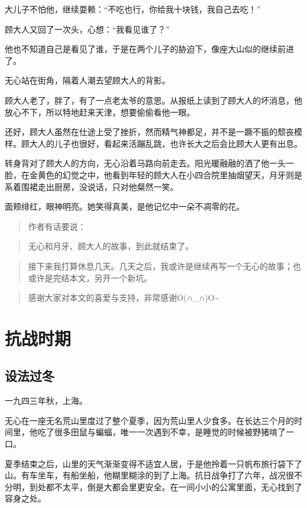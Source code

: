 大儿子不怕他，继续耍赖：``不吃也行，你给我十块钱，我自己去吃！''

顾大人又回了一次头，心想：``我看见谁了？''

他也不知道自己是看见了谁，于是在两个儿子的胁迫下，像座大山似的继续前进了。

无心站在街角，隔着人潮去望顾大人的背影。

顾大人老了，胖了，有了一点老太爷的意思。从报纸上读到了顾大人的坏消息，他放心不下，所以特地赶来天津，想要偷偷看他一眼。

还好，顾大人虽然在仕途上受了挫折，然而精气神都足，并不是一蹶不振的颓丧模样。顾大人的儿子也很好，看起来活蹦乱跳，也许长大之后会比顾大人更有出息。

转身背对了顾大人的方向，无心沿着马路向前走去。阳光暖融融的洒了他一头一脸，在金黄色的幻觉之中，他看到年轻的顾大人在小四合院里抽烟望天，月牙则是系着围裙走出厨房，没说话，只对他粲然一笑。

面颊绯红，眼神明亮。她笑得真美，是他记忆中一朵不凋零的花。

\begin{quote}
作者有话要说：
\end{quote}

\begin{quote}
无心和月牙、顾大人的故事，到此就结束了。
\end{quote}

\begin{quote}
接下来我打算休息几天。几天之后，我或许是继续再写一个无心的故事；也或许是完结本文，另开一个新坑。
\end{quote}

\begin{quote}
感谢大家对本文的喜爱与支持，非常感谢O(∩\_∩)O\textasciitilde{}
\end{quote}

\part{抗战时期}

\chapter{设法过冬}

一九四三年秋，上海。

无心在一座无名荒山里度过了整个夏季，因为荒山里人少食多。在长达三个月的时间里，他吃了很多田鼠与蝙蝠，唯一一次遇到不幸，是睡觉的时候被野猪啃了一口。

夏季结束之后，山里的天气渐渐变得不适宜人居，于是他拎着一只帆布旅行袋下了山。有车坐车，有船坐船，他糊里糊涂的到了上海。抗日战争打了六年，战况很不分明，到处都不太平，倒是大都会里更安全。在一间小小的公寓里面，无心找到了容身之处。

